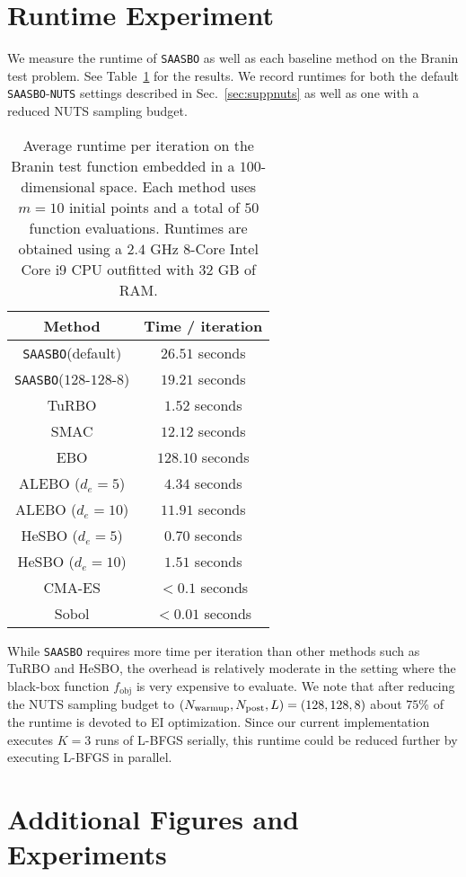 \documentclass[accepted]{uai2021} %
\newcommand{\fobj}{f_{\text{obj}}}
\newcommand{\algoname}{{\texttt {SAASBO}}}
\begin{document}
\section{Runtime Experiment}
\label{sec:runtime}
We measure the runtime of \algoname{} as well as each baseline method
on the Branin test problem. See Table~\ref{tab:runtimes} for the results.
We record runtimes for both the default \algoname-\texttt{NUTS} settings described in
Sec.~\ref{sec:suppnuts} as well as one with a reduced NUTS sampling budget.
\begin{table}[!ht]
  \centering
  \caption{Average runtime per iteration on the Branin test function embedded in a $100$-dimensional space.
    Each method uses $m=10$ initial points and a total of $50$ function evaluations.
    Runtimes are obtained using a $2.4$ GHz $8$-Core Intel Core i9 CPU outfitted with $32$ GB of RAM.}
  \label{tab:runtimes}
  \begin{tabular}{c|c}
    Method & Time / iteration \\
    \hline
      \algoname \;(default) & $26.51$ seconds \\
      \algoname \;($128$-$128$-$8$) & $19.21$ seconds \\
    TuRBO & $1.52$ seconds \\
    SMAC & $12.12$ seconds \\
    EBO & $128.10$ seconds \\
    ALEBO ($d_e=5$) & $4.34$ seconds \\
    ALEBO ($d_e=10$) & $11.91$ seconds \\
    HeSBO ($d_e=5$) & $0.70$ seconds \\
    HeSBO ($d_e=10$) & $1.51$ seconds \\
    CMA-ES & $< 0.1$ seconds \\
    Sobol & $< 0.01$ seconds \\
  \end{tabular}
\end{table}
While \algoname{} requires more time per iteration than other methods such as TuRBO and HeSBO, the overhead is
relatively moderate in the setting where the black-box function $\fobj$ is very expensive to evaluate.
We note that after reducing the NUTS sampling budget to $(N_{\rm warmup}, N_{\rm post}, L) = (128, 128, 8)$
about $75$\% of the runtime is devoted to EI optimization. Since our current implementation
executes $K=3$ runs of L-BFGS serially, this runtime could be reduced further by executing L-BFGS in parallel.


\section{Additional Figures and Experiments}
\label{sec:addexp}
\end{document}
